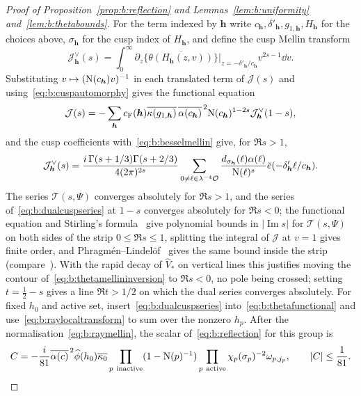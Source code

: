\begin{proof}[Proof of Proposition~\ref{prop:b:reflection} and Lemmas~\ref{lem:b:uniformity} and~\ref{lem:b:thetabounds}]
For the term indexed by $\boldsymbol h$ write $c_{\boldsymbol h},\delta'_{\boldsymbol h},g_{1,\boldsymbol h},H_{\boldsymbol h}$ for the choices above, $\sigma_{\boldsymbol h}$ for the cusp index of $H_{\boldsymbol h}$, and define the cusp Mellin transform
\[
  \mathcal J^\vee_{\boldsymbol h}(s)=\int_0^\infty\partial_z\bigl\{\overline{\theta(H_{\boldsymbol h}(z,v))}\bigr\}\Big|_{z=-\delta'_{\boldsymbol h}/c_{\boldsymbol h}}v^{2s-1}\dd v.
\]
Substituting $v\mapsto(\mathrm{N}(c_{\boldsymbol h})v)^{-1}$ in each translated term of $\mathcal J(s)$ and using~\eqref{eq:b:cuspautomorphy} gives the functional equation
\begin{equation}\label{eq:b:thetafunctional}
  \mathcal J(s)=-\sum_{\boldsymbol h}c_{\rm F}(\boldsymbol h)\overline{\kappa(g_{1,\boldsymbol h})}\,\overline{\alpha(c_{\boldsymbol h})}^{\,2}\mathrm{N}(c_{\boldsymbol h})^{1-2s}\mathcal J^\vee_{\boldsymbol h}(1-s),
\end{equation}
and the cusp coefficients with~\eqref{eq:b:besselmellin} give, for $\Re s>1$,
\begin{equation}\label{eq:b:dualcuspseries}
  \mathcal J^\vee_{\boldsymbol h}(s)=\frac{i\,\Gamma(s+1/3)\Gamma(s+2/3)}{4(2\pi)^{2s}}\sum_{0\ne\ell\in\lambda^{-4}\mathcal{O}}\frac{d_{\sigma_{\boldsymbol h}}(\ell)\alpha(\ell)}{\mathrm{N}(\ell)^s}\breve e(-\delta'_{\boldsymbol h}\ell/c_{\boldsymbol h}).
\end{equation}
The series $\mathcal T(s,\Psi)$ converges absolutely for $\Re s>1$, and the series of~\eqref{eq:b:dualcuspseries} at $1-s$ converges absolutely for $\Re s<0$; the functional equation and Stirling's formula~\cite[\S5.A.4]{IK04} give polynomial bounds in $|\operatorname{Im}s|$ for $\mathcal T(s,\Psi)$ on both sides of the strip $0\le\Re s\le1$, splitting the integral of $\mathcal J$ at $v=1$ gives finite order, and Phragm\'en--Lindel\"of~\cite[Theorem~5.53]{IK04} gives the same bound inside the strip (compare~\cite[Propositions~5.1--5.2]{DR}). With the rapid decay of $\widehat V_*$ on vertical lines this justifies moving the contour of~\eqref{eq:b:thetamellininversion} to $\Re s<0$, no pole being crossed; setting $t=\frac12-s$ gives a line $\Re t>1/2$ on which the dual series converges absolutely. For fixed $h_0$ and active set, insert~\eqref{eq:b:dualcuspseries} into~\eqref{eq:b:thetafunctional} and use~\eqref{eq:b:raylocaltransform} to sum over the nonzero $h_p$. After the normalisation~\eqref{eq:b:raymellin}, the scalar of~\eqref{eq:b:reflection} for this group is
\[
  C=-\frac i{81}\overline{\alpha(c)}^{\,2}\widehat\phi(h_0)\overline{\kappa_0}\prod_{p\ {\rm inactive}}(1-\NK(p)^{-1})\prod_{p\ {\rm active}}\chi_p(\sigma_p)^{-2}\omega_{p,j_p},\qquad|C|\le\frac1{81}.
\]
\end{proof}
